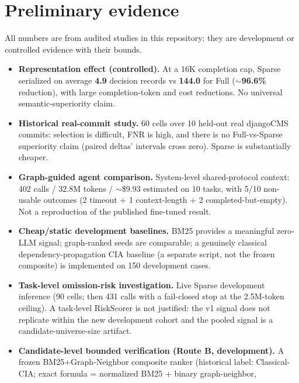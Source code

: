 \documentclass[11pt,a4paper]{article}
\begin{document}
\section{Preliminary evidence}
\label{sec:prelim}

All numbers are from audited studies in this repository; they are development
or controlled evidence with their bounds.

\begin{itemize}
  \item \textbf{Representation effect (controlled).} At a 16K completion cap,
        Sparse serialized on average \textbf{4.9} decision records vs
        \textbf{144.0} for Full ($\sim$\textbf{96.6\%} reduction), with large
        completion-token and cost reductions. No universal semantic-superiority
        claim.
  \item \textbf{Historical real-commit study.} 60 cells over 10 held-out real
        djangoCMS commits: selection is difficult, FNR is high, and there is no
        Full-vs-Sparse superiority claim (paired deltas' intervals cross zero).
        Sparse is substantially cheaper.
  \item \textbf{Graph-guided agent comparison.} System-level shared-protocol
        context: 402 calls / 32.8M tokens / $\sim$\$9.93 estimated on 10 tasks,
        with 5/10 non-usable outcomes (2 timeout + 1 context-length + 2
        completed-but-empty). Not a reproduction of the published fine-tuned
        result.
  \item \textbf{Cheap/static development baselines.} BM25 provides a meaningful
        zero-LLM signal; graph-ranked seeds are comparable; a genuinely
        classical dependency-propagation CIA baseline (a separate script, not
        the frozen composite) is implemented on 150 development cases.
  \item \textbf{Task-level omission-risk investigation.} Live Sparse
        development inference (90 cells; then 431 calls with a fail-closed stop
        at the 2.5M-token ceiling). A task-level RiskScorer is not justified:
        the v1 signal does not replicate within the new development cohort and
        the pooled signal is a candidate-universe-size artifact.
  \item \textbf{Candidate-level bounded verification (Route B, development).}
        A frozen BM25+Graph-Neighbor composite ranker (historical label:
        Classical-CIA; exact formula = normalized BM25 + binary graph-neighbor,

\end{itemize}
\end{document}

